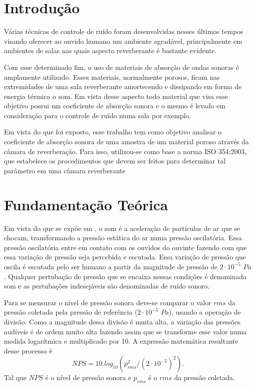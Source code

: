 \chapter{Introdução}\label{introducao}
Várias técnicas de controle de ruído foram desenvolvidas nesses últimos tempos visando oferecer ao ouvido humano um ambiente agradável, principalmente em ambientes de salas nas quais aspecto reverberante é bastante evidente.

Com esse determinado fim, o uso de materiais de absorção de ondas sonoras é amplamente utilizado. Esses materiais, normalmente porosos, ficam nas extremidades de uma sala reverberante amortecendo e dissipando em forma de energia térmica o som. Em vista desse aspecto todo material que visa esse objetivo possui um coeficiente de absorção sonora e o mesmo é levado em consideração para o controle de ruído numa sala por exemplo.

Em vista do que foi exposto, esse trabalho tem como objetivo analisar o coeficiente de absorção sonora de uma amostra de um material poroso através da câmara de reverberação. Para isso, utilizou-se
como base a norma ISO 354:2003, que estabelece os procedimentos que devem ser feitos para
determinar tal parâmetro em uma câmara reverberante

\chapter{Fundamentação Teórica}\label{fundamentacao}
Em vista do que se expõe em \cite{bistafa}, o som é a aceleração de partículas de ar que se chocam, transformando a pressão estática do ar numa pressão oscilatória. Essa pressão oscilatória entre em contato com os ouvidos do ouvinte fazendo com que essa variação de pressão seja percebida e escutada. Essa variação de pressão que oscila é escutada pelo ser humano a partir da magnitude de pressão de $2\cdot10^{-5}$ $Pa$. Qualquer pertubação de pressão que se encaixa nessas condições é denominada som e as pertubações indesejáveis são denominadas de ruído sonoro.

Para se mensurar o nível de pressão sonora deve-se comparar	o valor $rms$ da pressão coletada pela pressão de referência ($2\cdot10^{-5}$ $Pa$), usando a operação de divisão. Como a magnitude dessa divisão é muita alta, a variação das pressões audíveis é de ordem muito alta fazendo assim que se transforme esse valor numa medida logarítmica e multiplicado por 10. A expressão matemática resultante desse processo é 
\begin{equation}
  NPS  = 10 . log_10(p_{rms}^{2}/(2\cdot10^{-5})^{2}).
\end{equation}
Tal que $NPS$ é o nível de pressão sonora e $p_{rms}$ é o $rms$ da pressão coletada.


